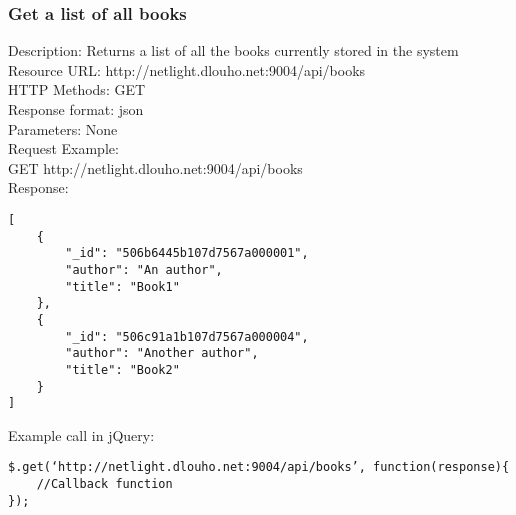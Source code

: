 \subsubsection{Get a list of all books}
Description: Returns a list of all the books currently stored in the system 		\\
\newline
Resource URL: http://netlight.dlouho.net:9004/api/books	\\
HTTP Methods: GET		\\
Response format: json	\\
Parameters: None		\\
\newline
Request Example:		\\
GET			http://netlight.dlouho.net:9004/api/books 	\\
\newline
Response:
\begin{verbatim}
[
    {
        "_id": "506b6445b107d7567a000001",
        "author": "An author",
        "title": "Book1"
    },
    {
        "_id": "506c91a1b107d7567a000004",
        "author": "Another author",
        "title": "Book2"
    }
]
\end{verbatim}
Example call in jQuery:
\begin{verbatim}
$.get(‘http://netlight.dlouho.net:9004/api/books’, function(response){
	//Callback function
});
\end{verbatim}

